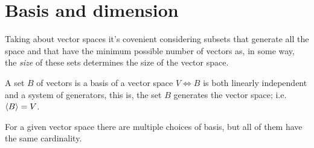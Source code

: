 



\section{Basis and dimension}
Taking about vector spaces it's covenient considering subsets that generate all the space and that have
the minimum possible number of vectors as, in some way, the \textit{size} of these sets determines the size
of the vector space.

\begin{defn}[Basis]
    A set $B$ of vectors is a basis of a vector space $V\iff B$ is both linearly independent and a system of
    generators, this is, the set $B$ generates the vector space; i.e. $\langle B \rangle = V$.
\end{defn}

\begin{remark}
    For a given vector space there are multiple choices of basis, but all of them have the same cardinality.
\end{remark}

